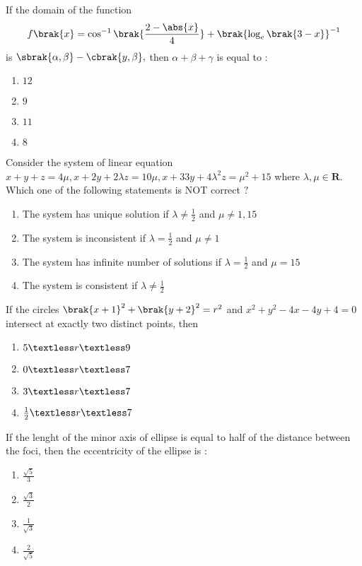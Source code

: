     \item If the domain of the function $$f\brak{x}=\cos^{-1}\brak{\frac{2-\abs{x}}{4}}+\brak{\log_e\brak{3-x}}^{-1}$$ is $\sbrak{\alpha,\beta}-\cbrak{y,\beta},$ then $\alpha+\beta+\gamma$ is equal to $:$
	   \hfill{} \\
    \begin{enumerate}
        \item $12$
        \item $9$
        \item $11$
        \item $8$
\end{enumerate}
\item Consider the system of linear equation $x+y+z=4\mu,x+2y+2\lambda z=10\mu,x+33y+4\lambda^2z=\mu^2+15$ where $\lambda,\mu\in \textbf{R}.$ Which one of the following statements is NOT correct $?$
\hfill{}	\\
\begin{enumerate}
    \item The system has unique solution if $\lambda \neq \frac{1}{2}$ and $\mu\neq 1,15$
    \item The system is inconsistent if $\lambda=\frac{1}{2}$ and $\mu\neq 1$
    \item The system has infinite number of solutions if $\lambda=\frac{1}{2}$ and $\mu=15$
    \item The system is consistent if $\lambda\neq\frac{1}{2}$
\end{enumerate}
\item If the circles $\brak{x+1}^2+\brak{y+2}^2=r^2$ and $x^2+y^2-4x-4y+4=0$ intersect at exactly two distinct points, then
\hfill{}	\\
\begin{enumerate}
    \item $5\textless r\textless 9$
    \item $0\textless r\textless 7$
    \item $3\textless r\textless 7$
    \item $\frac{1}{2}\textless r\textless 7$
\end{enumerate}
\item If the lenght of the minor axis of ellipse is equal to half of the distance between the foci, then the eccentricity of the ellipse is $:$
\hfill{}	\\
\begin{enumerate}
    \item $\frac{\sqrt{5}}{3}$
    \item $\frac{\sqrt{3}}{2}$
    \item $\frac{1}{\sqrt{3}}$
    \item $\frac{2}{\sqrt{5}}$
\end{enumerate}
